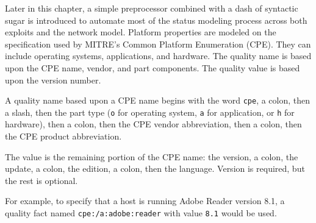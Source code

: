 Later in this chapter, a simple preprocessor combined with a dash of syntactic sugar
is introduced to automate most of the status modeling process across both exploits
and the network model.
Platform properties are modeled on the specification used by MITRE's Common Platform
Enumeration (CPE). They can include operating systems, applications, and hardware. The
quality name is based upon the CPE name, vendor, and part components. The quality value
is based upon the version number.

A quality name based upon a CPE name begins with the word \texttt{cpe}, a colon, then a
slash, then the part type (\texttt{o} for operating system, \texttt{a} for
application, or \texttt{h} for hardware), then a colon, then the CPE vendor abbreviation,
then a colon, then the CPE product abbreviation.

The value is the remaining portion of the CPE name: the version, a colon, the update, a colon, 
the edition, a colon, then the language. Version is required, but the rest is optional.

For example, to specify that a host is running Adobe Reader version 8.1, a quality fact named
\texttt{cpe:/a:adobe:reader} with value \texttt{8.1} would be used.
